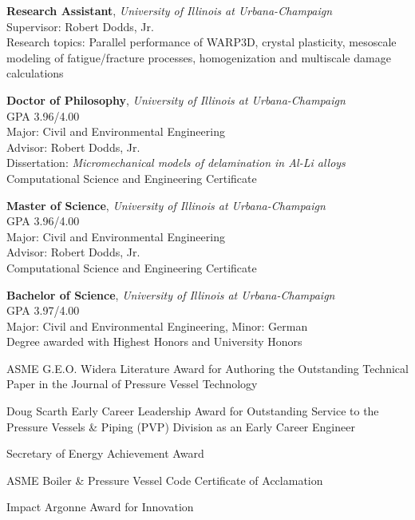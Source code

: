 \textbf{Research Assistant}, \emph{University of Illinois at Urbana-Champaign}
\\
Supervisor: Robert Dodds, Jr. \\
Research topics: Parallel performance of WARP3D, crystal plasticity,
mesoscale modeling of fatigue/fracture processes, homogenization and
multiscale damage calculations


\textbf{Doctor of Philosophy},  \emph{University of Illinois at Urbana-Champaign}\\
GPA 3.96/4.00\\
Major: Civil and Environmental Engineering\\
Advisor: Robert Dodds, Jr. \\
Dissertation: \textit{Micromechanical models of delamination in Al-Li
alloys}\\
Computational Science and Engineering Certificate

\textbf{Master of Science},  \emph{University of Illinois at Urbana-Champaign}\\
GPA 3.96/4.00\\
Major: Civil and Environmental Engineering\\
Advisor: Robert Dodds, Jr. \\
Computational Science and Engineering Certificate

\textbf{Bachelor of Science},  \emph{University of Illinois at Urbana-Champaign}\\
GPA 3.97/4.00\\
Major: Civil and Environmental Engineering, Minor: German\\
Degree awarded with Highest Honors and University Honors 


ASME  G.E.O. Widera Literature Award for Authoring the Outstanding Technical Paper in the Journal of Pressure Vessel Technology 

Doug  Scarth Early Career Leadership Award for Outstanding Service to the Pressure Vessels \& Piping (PVP) Division as an Early Career Engineer

Secretary of Energy Achievement Award 

ASME Boiler \& Pressure Vessel Code Certificate of Acclamation 

Impact Argonne Award for Innovation 

